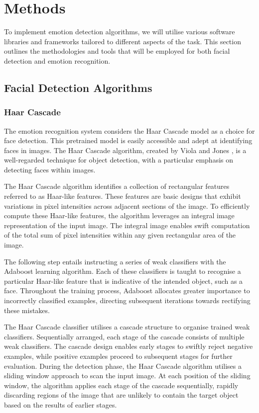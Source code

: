 \section{Methods}

To implement emotion detection algorithms, we will utilise various software libraries and frameworks tailored to different aspects of the task. This section outlines the methodologies and tools that will be employed for both facial detection and emotion recognition.

\subsection{Facial Detection Algorithms}

\subsubsection{Haar Cascade}

The emotion recognition system considers the Haar Cascade model as a choice for face detection. This pretrained model is easily accessible and adept at identifying faces in images. The Haar Cascade algorithm, created by Viola and Jones \cite{Viola990517}, is a well-regarded technique for object detection, with a particular emphasis on detecting faces within images.

The Haar Cascade algorithm identifies a collection of rectangular features referred to as Haar-like features. These features are basic designs that exhibit variations in pixel intensities across adjacent sections of the image. To efficiently compute these Haar-like features, the algorithm leverages an integral image representation of the input image. The integral image enables swift computation of the total sum of pixel intensities within any given rectangular area of the image.

The following step entails instructing a series of weak classifiers with the Adaboost learning algorithm. Each of these classifiers is taught to recognise a particular Haar-like feature that is indicative of the intended object, such as a face. Throughout the training process, Adaboost allocates greater importance to incorrectly classified examples, directing subsequent iterations towards rectifying these mistakes.

The Haar Cascade classifier utilises a cascade structure to organise trained weak classifiers. Sequentially arranged, each stage of the cascade consists of multiple weak classifiers. The cascade design enables early stages to swiftly reject negative examples, while positive examples proceed to subsequent stages for further evaluation. During the detection phase, the Haar Cascade algorithm utilises a sliding window approach to scan the input image. At each position of the sliding window, the algorithm applies each stage of the cascade sequentially, rapidly discarding regions of the image that are unlikely to contain the target object based on the results of earlier stages.

